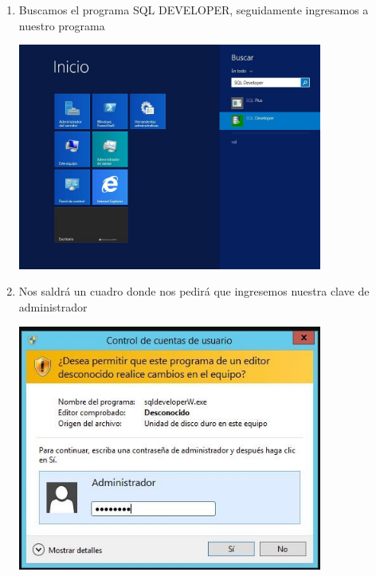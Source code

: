 \begin{enumerate}[1.]
	\hfill \break
	\hfill \break
	\hfill \break
	\hfill \break
	\hfill \break
	\hfill \break
	\hfill \break
	\hfill \break
	\item Buscamos el programa SQL DEVELOPER, seguidamente ingresamos a nuestro programa\\
	\begin{center}
	\includegraphics[width=10cm]{./Imagenes/img24} 
	\end{center}

	\item Nos saldr\'a un cuadro donde nos pedir\'a que ingresemos nuestra clave de administrador\\
	\begin{center}
	\includegraphics[width=10cm]{./Imagenes/img25} 
	\end{center}


\end{enumerate}
